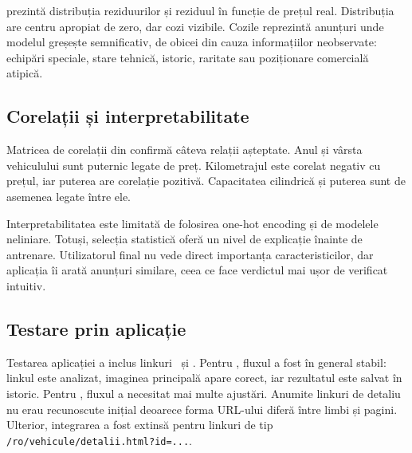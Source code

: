 
 prezintă distribuția reziduurilor și reziduul în funcție de prețul real. Distribuția are centru apropiat de zero, dar cozi vizibile. Cozile reprezintă anunțuri unde modelul greșește semnificativ, de obicei din cauza informațiilor neobservate: echipări speciale, stare tehnică, istoric, raritate sau poziționare comercială atipică.


\subsection{Corelații și interpretabilitate}
\label{sec:evaluation-correlations}

Matricea de corelații din  confirmă câteva relații așteptate. Anul și vârsta vehiculului sunt puternic legate de preț. Kilometrajul este corelat negativ cu prețul, iar puterea are corelație pozitivă. Capacitatea cilindrică și puterea sunt de asemenea legate între ele.


Interpretabilitatea este limitată de folosirea one-hot encoding și de modelele neliniare. Totuși, selecția statistică oferă un nivel de explicație înainte de antrenare. Utilizatorul final nu vede direct importanța caracteristicilor, dar aplicația îi arată anunțuri similare, ceea ce face verdictul mai ușor de verificat intuitiv.

\subsection{Testare prin aplicație}
\label{sec:evaluation-app-tests}

Testarea aplicației a inclus linkuri \autovit\ și \mobilede. Pentru \autovit, fluxul a fost în general stabil: linkul este analizat, imaginea principală apare corect, iar rezultatul este salvat în istoric. Pentru \mobilede, fluxul a necesitat mai multe ajustări. Anumite linkuri de detaliu nu erau recunoscute inițial deoarece forma URL-ului diferă între limbi și pagini. Ulterior, integrarea a fost extinsă pentru linkuri de tip \texttt{/ro/vehicule/detalii.html?id=...}.

